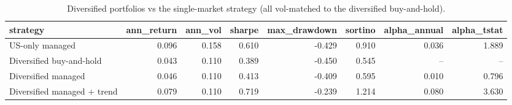 \begin{table}[htbp]
\centering
\caption{Diversified portfolios vs the single-market strategy (all vol-matched to the diversified buy-and-hold).}
\label{tab:diversified}
\small
\begin{tabular}{lrrrrrrr}
\toprule
strategy & ann\_return & ann\_vol & sharpe & max\_drawdown & sortino & alpha\_annual & alpha\_tstat \\
\midrule
US-only managed & 0.096 & 0.158 & 0.610 & -0.429 & 0.910 & 0.036 & 1.889 \\
Diversified buy-and-hold & 0.043 & 0.110 & 0.389 & -0.450 & 0.545 & -- & -- \\
Diversified managed & 0.046 & 0.110 & 0.413 & -0.409 & 0.595 & 0.010 & 0.796 \\
Diversified managed + trend & 0.079 & 0.110 & 0.719 & -0.239 & 1.214 & 0.080 & 3.630 \\
\bottomrule
\end{tabular}
\end{table}
